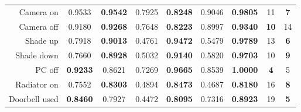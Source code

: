 \begin{table*}
\begin{center}
{\begin{tabular}{r|cc|cc|cc|cc}
				Camera on                                                & 0.9533                              & \textbf{0.9542}                     & 0.7925                              & \textbf{0.8248}                     & 0.9046                              & \textbf{0.9805}                     & 11                                  & \textbf{7}                          \\
				Camera off                                               & 0.9180                              & \textbf{0.9268}                     & 0.7648                              & \textbf{0.8223}                     & 0.8997                              & \textbf{0.9340}                     & \textbf{10}                         & 14                                  \\
				Shade up                                                 & 0.7918                              & \textbf{0.9013}                     & 0.4761                              & \textbf{0.9472}                     & 0.5479                              & \textbf{0.9789}                     & 13                                  & \textbf{6}                          \\
				Shade down                                               & 0.7660                              & \textbf{0.8928}                     & 0.5032                              & \textbf{0.9140}                     & 0.5820                              & \textbf{0.9703}                     & 10                                  & \textbf{9}                          \\
				PC off                                                   & \textbf{0.9233}                     & 0.8621                              & 0.7269                              & \textbf{0.9665}                     & 0.8539                              & \textbf{1.0000}                     & \textbf{4}                          & 5                                   \\
				Radiator on                                              & 0.7552                              & \textbf{0.8303}                     & 0.4894                              & \textbf{0.8473}                     & 0.4687                              & \textbf{0.8180}                     & 16                                  & \textbf{8}                          \\
				Doorbell used                                            & \textbf{0.8460}                     & 0.7927                              & 0.4472                              & \textbf{0.8095}                     & 0.7316                              & \textbf{0.8923}                     & 19                                  & \textbf{5}                          \\

\end{tabular}}
\end{center}
\end{table*}
